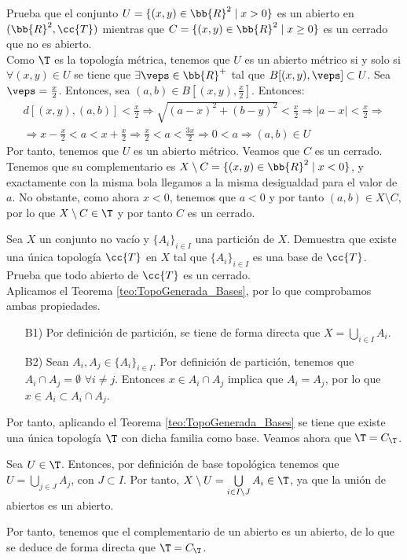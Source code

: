 \begin{ejercicio}
    Prueba que el conjunto $U=\{(x,y)\in \bb{R}^2\mid x>0\}$ es un abierto en $(\bb{R}^2, \cc{T})$ mientras que $C=\{(x,y)\in \bb{R}^2\mid x\geq 0\}$ es un cerrado que no es abierto.\\

    Como $\T$ es la topología métrica, tenemos que $U$ es un abierto métrico si y solo si $\forall (x,y)\in U$ se tiene que $\exists \veps\in \bb{R}^+$ tal que $B[(x,y),\veps]\subset U$. Sea $\veps=\frac{x}{2}$. Entonces, sea $(a,b)\in B\left[(x,y),\frac{x}{2}\right]$. Entonces:
    \begin{multline*}
        d[(x,y),(a,b)]<\frac{x}{2}\Longrightarrow \sqrt{(a-x)^2 + (b-y)^2} < \frac{x}{2} \Longrightarrow |a-x| < \frac{x}{2} \Longrightarrow \\ \Longrightarrow x-\frac{x}{2} < a < x+\frac{x}{2} \Longrightarrow \frac{x}{2} < a < \frac{3x}{2} \Longrightarrow 0<a \Longrightarrow (a,b)\in U
    \end{multline*}
    Por tanto, tenemos que $U$ es un abierto métrico. Veamos que $C$ es un cerrado. Tenemos que su complementario es $X\setminus C = \{(x,y)\in \bb{R}^2\mid x< 0\}$, y exactamente con la misma bola llegamos a la misma desigualdad para el valor de $a$. No obstante, como ahora $x<0$, tenemos que $a<0$ y por tanto $(a,b)\in X\setminus C$, por lo que $X\setminus C\in \T$ y por tanto $C$ es un cerrado.
\end{ejercicio}


\begin{ejercicio}
    Sea $X$ un conjunto no vacío y $\{A_i\}_{i\in I}$ una partición de $X$. Demuestra que existe una única topología $\cc{T}$ en $X$ tal que $\{A_i\}_{i\in I}$ es una base de $\cc{T}$. Prueba que todo abierto de $\cc{T}$ es un cerrado.\\

    Aplicamos el Teorema \ref{teo:TopoGenerada_Bases}, por lo que comprobamos ambas propiedades.
    \begin{enumerate}
        \item[B1)] Por definición de partición, se tiene de forma directa que $X=\bigcup\limits_{i\in I}A_i$.
        \item[B2)] Sean $A_i,A_j\in \{A_i\}_{i\in I}$. Por definición de partición, tenemos que $A_i\cap A_j=\emptyset$ $\forall i\neq j$. Entonces $x\in A_i\cap A_j$ implica que $A_i=A_j$, por lo que $x\in A_i\subset A_i\cap A_j$.
    \end{enumerate}
    Por tanto, aplicando el Teorema \ref{teo:TopoGenerada_Bases} se tiene que existe una única topología $\T$ con dicha familia como base. Veamos ahora que $\T=C_\T$.
    
    Sea $U\in \T$. Entonces, por definición de base topológica tenemos que $U=\bigcup\limits_{j\in J}A_j$, con $J\subset I$. Por tanto, $X\setminus U = \bigcup\limits_{i\in I\setminus J}A_i\in \T$, ya que la unión de abiertos es un abierto.

    Por tanto, tenemos que el complementario de un abierto es un abierto, de lo que se deduce de forma directa que $\T=C_\T$.
\end{ejercicio}

